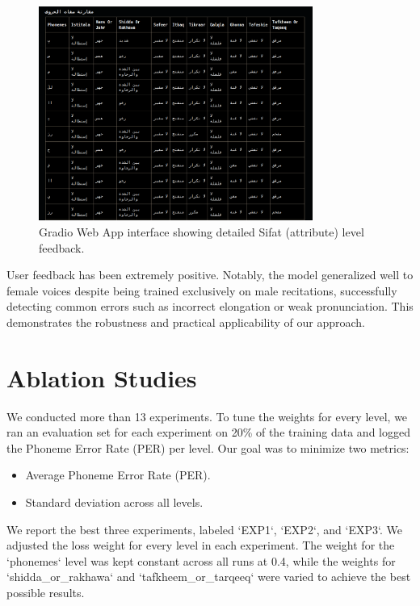 \begin{figure}[H]
\centering
\includegraphics[width=0.8\textwidth]{../figures/gradio_ui_sifa.png}
\caption{Gradio Web App interface showing detailed Sifat (attribute) level feedback.}
\label{fig:gradio_sifa}
\end{figure}

User feedback has been extremely positive. Notably, the model generalized well to female voices despite being trained exclusively on male recitations, successfully detecting common errors such as incorrect  elongation or weak  pronunciation. This demonstrates the robustness and practical applicability of our approach.



\section{Ablation Studies}

We conducted more than 13 experiments. To tune the weights for every level, we ran an evaluation set for each experiment on 20\% of the training data and logged the Phoneme Error Rate (PER) per level. Our goal was to minimize two metrics:
\begin{itemize}
\item Average Phoneme Error Rate (PER).
\item Standard deviation across all levels.
\end{itemize}

We report the best three experiments, labeled `EXP1`, `EXP2`, and `EXP3`. We adjusted the loss weight for every level in each experiment. The weight for the `phonemes` level was kept constant across all runs at 0.4, while the weights for `shidda_or_rakhawa` and `tafkheem_or_tarqeeq` were varied to achieve the best possible results.

